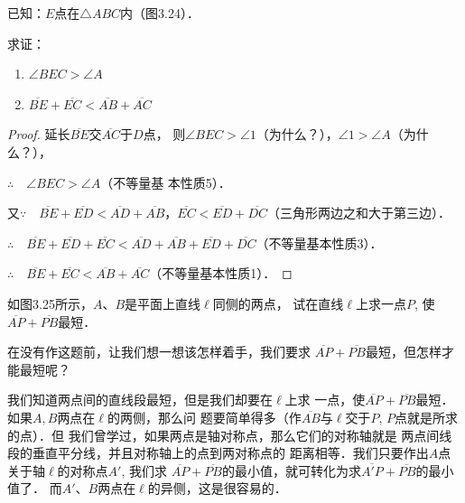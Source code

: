 \begin{example}
    已知：$E$点在$\triangle ABC$内（图3.24）．

求证： \begin{enumerate}
    \item $\angle BEC>\angle A$
    \item $\overline{BE}+\overline{EC}<\overline{AB}+\overline{AC}$
\end{enumerate} 
\end{example}

\begin{proof}
    延长$\overline{BE}$交$\overline{AC}$于$D$点，
则$\angle BEC>\angle 1$（为什么？），$\angle 1>\angle A$（为什么？），

$\therefore\quad \angle BEC>\angle A$（不等量基
本性质5）．

又$\because\quad \overline{BE}+\overline{ED}<\overline{AD}+\overline{AB}$，$\overline{EC}<\overline{ED}+\overline{DC}$（三角形两边之和大于第三边）．

$\therefore\quad \overline{BE}+\overline{ED}+\overline{EC}<\overline{AD}+\overline{AB}+\overline{ED}+\overline{DC}$（不等量基本性质3）．

$\therefore\quad \overline{BE}+\overline{EC}<\overline{AB}+\overline{AC}$（不等量基本性质1）．
\end{proof}

\begin{example}
如图3.25所示，$A$、$B$是平面上直线$\ell$同侧的两点，
试在直线$\ell$上求一点$P$, 使$\overline{AP}+\overline{PB}$最短．

在没有作这题前，让我们想一想该怎样着手，我们要求
$\overline{AP}+\overline{PB}$最短，但怎样才能最短呢？

我们知道两点间的直线段最短，但是我们却要在$\ell$上求
一点，使$\overline{AP}+\overline{PB}$最短．如果$A,B$两点在$\ell$的两侧，那么问
题要简单得多（作$\overline{AB}$与$\ell$交于$P$, $P$点就是所求的点）．但
我们曾学过，如果两点是轴对称点，那么它们的对称轴就是
两点间线段的垂直平分线，并且对称轴上的点到两对称点的
距离相等．我们只要作出$A$点关于轴$\ell$的对称点$A'$, 我们求
$\overline{AP}+\overline{PB}$的最小值，就可转化为求$\overline{A'P}+\overline{PB}$的最小值了．
而$A'$、$B$两点在$\ell$的异侧，这是很容易的．

\begin{figure}[htp]
    \centering
{}
    \caption{}
\end{figure}
\end{example}


